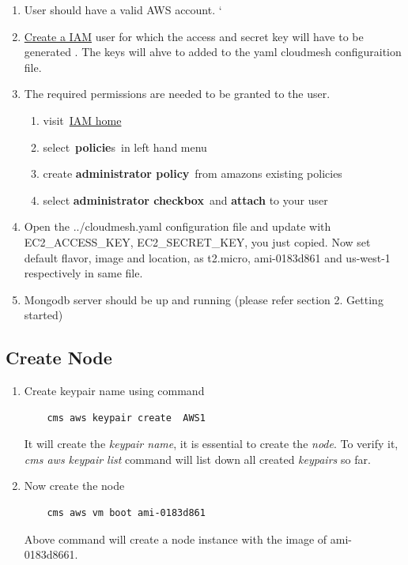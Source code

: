 \documentclass[9pt,twocolumn,twoside]{../../styles/osajnl}
\begin{document}

\begin{enumerate}

\item User should have a valid AWS account.  ` \item
  \href{https://console.aws.amazon.com/iam/home?#/users}{Create a IAM}
  \cite{www-aws-iam} user for which the access and secret key will
  have to be generated \cite{www-attach-policy}. The keys will ahve to
  added to the yaml cloudmesh configuraition file.
	
\item The required permissions are needed to be granted to the user.
  \begin{enumerate}
			
  \item visit \href{https://console.aws.amazon.com/iam/home} {IAM
      home}
  \item select \textbf{policie}s in left hand menu
  \item create \textbf{administrator policy} from amazons existing
    policies
  \item select \textbf{administrator checkbox} and \textbf{attach} to
    your user
  \end{enumerate}
		
\item Open the ../cloudmesh.yaml configuration file and update with
  EC2\_ACCESS\_KEY, EC2\_SECRET\_KEY, you just copied. Now set default
  flavor, image and location, as t2.micro, ami-0183d861 and us-west-1
  respectively in same file.

\item Mongodb server should be up and running (please refer section
  2. Getting started)


\end{enumerate}

\subsection{Create Node}

\begin{enumerate}

\item Create keypair name using command
	
	\begin{verbatim}
	cms aws keypair create  AWS1
	\end{verbatim}
	
  It will create the \textit{keypair name}, it is essential to create
  the \textit{node}. To verify it, \textit{cms aws keypair list}
  command will list down all created \textit{keypairs} so far.
	
\item Now create the node
	
	\begin{verbatim}
	cms aws vm boot ami-0183d861
	\end{verbatim}
	
  Above command will create a node instance with the image of
  ami-0183d8661.

\end{enumerate}	
\end{document}
